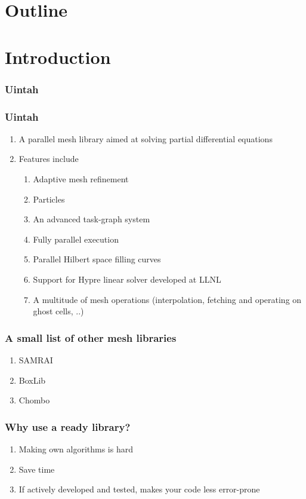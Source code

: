 \documentclass{beamer}
\begin{document}
\section*{Outline}
\begin{frame}
 \tableofcontents
\end{frame}


\section{Introduction}

\begin{frame}
 \frametitle{Uintah}
\end{frame}


\begin{frame}
 \frametitle{Uintah}
 \begin{enumerate}
  \item A parallel mesh library aimed at solving partial differential equations
  \item Features include
  \begin{enumerate}
   \item Adaptive mesh refinement
   \item Particles
   \item An advanced task-graph system
   \item Fully parallel execution
   \item Parallel Hilbert space filling curves
   \item Support for Hypre linear solver developed at LLNL
   \item A multitude of mesh operations (interpolation, fetching and operating on ghost cells, ..)
  \end{enumerate}
 \end{enumerate}
\end{frame}

\begin{frame}
 \frametitle{A small list of other mesh libraries}
 \begin{enumerate}
  \item SAMRAI
  \item BoxLib
  \item Chombo
 \end{enumerate}
\end{frame}

\begin{frame}
 \frametitle{Why use a ready library?}
 \begin{enumerate}
  \item Making own algorithms is hard
  \item Save time
  \item If actively developed and tested, makes your code less error-prone
 \end{enumerate}
\end{frame}
\end{document}
